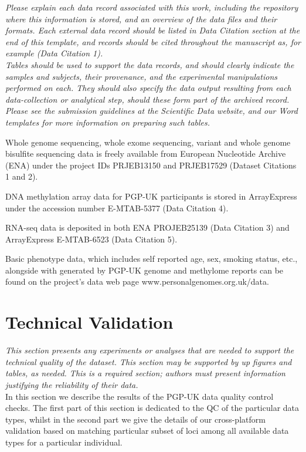 \documentclass[english]{article}
\begin{document}
\textit{Please explain each data record associated with this work, including
the repository where this information is stored, and an overview of
the data files and their formats. Each external data record should
be listed in Data Citation section at the end of this template, and 
records should be cited throughout the manuscript as, for example 
(Data Citation 1).\\
Tables should be used to support the data records, and should clearly indicate 
the samples and subjects, their provenance, and the experimental manipulations 
performed on each. They should also specify the data output resulting from each 
data-collection or analytical step, should these form part of the archived record. 
Please see the submission guidelines at the \emph{Scientific Data} website, and 
our Word templates for more information on preparing such tables.}

Whole genome sequencing, whole exome sequencing, variant and whole genome bisulfite sequencing data is freely available from European Nucleotide Archive (ENA) under the project IDs PRJEB13150 and PRJEB17529 (Dataset Citations 1 and 2).

DNA methylation array data for PGP-UK participants is stored in ArrayExpress under the accession number E-MTAB-5377 (Data Citation 4).

RNA-seq data is deposited in both ENA PROJEB25139 (Data Citation 3) and ArrayExpress E-MTAB-6523 (Data Citation 5).

Basic phenotype data, which includes self reported age, sex, smoking status, etc., alongside with generated by PGP-UK genome and methylome reports can be found on the project's data web page www.personalgenomes.org.uk/data.

\section*{Technical Validation}

\textit{This section presents any experiments or analyses that are needed
to support the technical quality of the dataset. This section may
be supported by up figures and tables, as needed. This is a required
section; authors must present information justifying the reliability
of their data.}\\

In this section we describe the results of the PGP-UK data quality control checks. The first part of this section is dedicated to the QC of the particular data types, whilst in the second part we give the details of our cross-platform validation based on matching particular subset of loci among all available data types for a particular individual.
\end{document}
